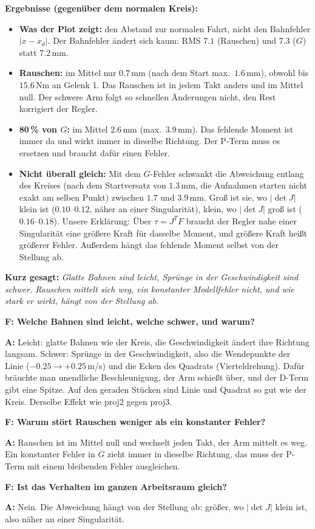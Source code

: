 \documentclass[10pt,a4paper]{article}
\newcommand{\frage}[2]{\textbf{F: #1}\par\nopagebreak\vspace{1pt}\textbf{A:} #2\par\vspace{5pt}}
\newcommand{\sagen}[1]{\textbf{Kurz gesagt:} \emph{#1}\par}
\begin{document}
\textbf{Ergebnisse (gegenüber dem normalen Kreis):}
\begin{itemize}
  \item \textbf{Was der Plot zeigt:} den Abstand zur normalen Fahrt, nicht den Bahnfehler $|x - x_d|$. Der Bahnfehler ändert sich kaum: RMS $7.1$ (Rauschen) und $7.3$ ($G$) statt $7.2$\,mm.
  \item \textbf{Rauschen:} im Mittel nur $0.7$\,mm (nach dem Start max.\ $1.6$\,mm), obwohl bis $15.6$\,Nm an Gelenk 1. Das Rauschen ist in
        jedem Takt anders und im Mittel null. Der schwere Arm folgt so schnellen Änderungen nicht, den Rest korrigiert der
        Regler.
  \item \textbf{80\,\% von $G$:} im Mittel $2.6$\,mm (max.\ $3.9$\,mm). Das fehlende Moment ist immer da und wirkt immer in
        dieselbe Richtung. Der P-Term muss es ersetzen und braucht dafür einen Fehler.
  \item \textbf{Nicht überall gleich:} Mit dem $G$-Fehler schwankt die Abweichung entlang des Kreises (nach dem Startversatz von $1.3$\,mm, die Aufnahmen starten nicht exakt am selben Punkt) zwischen $1.7$ und
        $3.9$\,mm. Groß ist sie, wo $|\det J|$ klein ist ($0.10$--$0.12$, näher an einer Singularität), klein, wo $|\det J|$
        groß ist ($0.16$--$0.18$). Unsere Erklärung: Über $\tau = J^T F$ braucht der Regler nahe einer Singularität eine
        größere Kraft für dasselbe Moment, und größere Kraft heißt größerer Fehler. Außerdem hängt das fehlende Moment selbst
        von der Stellung ab.
\end{itemize}

\sagen{Glatte Bahnen sind leicht, Sprünge in der Geschwindigkeit sind schwer. Rauschen mittelt sich weg, ein konstanter
Modellfehler nicht, und wie stark er wirkt, hängt von der Stellung ab.}

\begin{fragen}
\frage{Welche Bahnen sind leicht, welche schwer, und warum?}
{Leicht: glatte Bahnen wie der Kreis, die Geschwindigkeit ändert ihre Richtung langsam. Schwer: Sprünge in der
Geschwindigkeit, also die Wendepunkte der Linie ($-0.25 \to +0.25$\,m/s) und die Ecken des Quadrats (Vierteldrehung). Dafür
bräuchte man unendliche Beschleunigung, der Arm schießt über, und der D-Term gibt eine Spitze. Auf den geraden Stücken sind
Linie und Quadrat so gut wie der Kreis. Derselbe Effekt wie proj2 gegen proj3.}
\frage{Warum stört Rauschen weniger als ein konstanter Fehler?}
{Rauschen ist im Mittel null und wechselt jeden Takt, der Arm mittelt es weg. Ein konstanter Fehler in $G$ zieht immer in
dieselbe Richtung, das muss der P-Term mit einem bleibenden Fehler ausgleichen.}
\frage{Ist das Verhalten im ganzen Arbeitsraum gleich?}
{Nein. Die Abweichung hängt von der Stellung ab: größer, wo $|\det J|$ klein ist, also näher an einer Singularität.}
\end{fragen}
\end{document}
